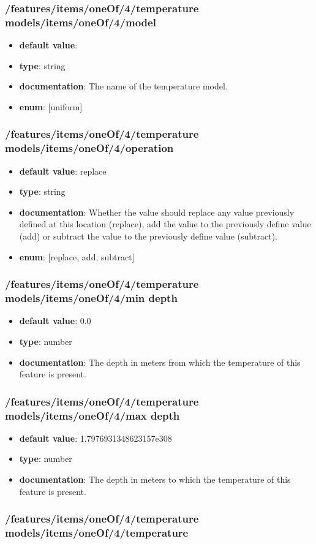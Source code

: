 \subsubsection{/features/items/oneOf/4/temperature models/items/oneOf/4/model}
\begin{itemize}\item {\bf default value}: 
\item {\bf type}: string
\item {\bf documentation}: The name of the temperature model.
\item {\bf enum}: [uniform]\end{itemize}\subsubsection{/features/items/oneOf/4/temperature models/items/oneOf/4/operation}
\begin{itemize}\item {\bf default value}: replace
\item {\bf type}: string
\item {\bf documentation}: Whether the value should replace any value previously defined at this location (replace), add the value to the previously define value (add) or subtract the value to the previously define value (subtract).
\item {\bf enum}: [replace, add, subtract]\end{itemize}\subsubsection{/features/items/oneOf/4/temperature models/items/oneOf/4/min depth}
\begin{itemize}\item {\bf default value}: 0.0
\item {\bf type}: number
\item {\bf documentation}: The depth in meters from which the temperature of this feature is present.
\end{itemize}\subsubsection{/features/items/oneOf/4/temperature models/items/oneOf/4/max depth}
\begin{itemize}\item {\bf default value}: 1.7976931348623157e308
\item {\bf type}: number
\item {\bf documentation}: The depth in meters to which the temperature of this feature is present.
\end{itemize}\subsubsection{/features/items/oneOf/4/temperature models/items/oneOf/4/temperature}
